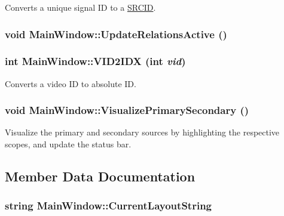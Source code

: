 Converts a unique signal ID to a \hyperlink{struct_s_r_c_i_d}{SRCID}. 

\hypertarget{class_main_window_c22d079e4851b5c33f45b08b4f788892}{
\subsubsection[{UpdateRelationsActive}]{\setlength{\rightskip}{0pt plus 5cm}void MainWindow::UpdateRelationsActive ()}}
\label{class_main_window_c22d079e4851b5c33f45b08b4f788892}


\hypertarget{class_main_window_556708726e6100f4a1a1ceb435988246}{
\subsubsection[{VID2IDX}]{\setlength{\rightskip}{0pt plus 5cm}int MainWindow::VID2IDX (int {\em vid})}}
\label{class_main_window_556708726e6100f4a1a1ceb435988246}


Converts a video ID to absolute ID. 

\hypertarget{class_main_window_fe5095ab6bf2691a33c51ee67121a867}{
\subsubsection[{VisualizePrimarySecondary}]{\setlength{\rightskip}{0pt plus 5cm}void MainWindow::VisualizePrimarySecondary ()}}
\label{class_main_window_fe5095ab6bf2691a33c51ee67121a867}


Visualize the primary and secondary sources by highlighting the respective scopes, and update the status bar. 



\subsection{Member Data Documentation}
\hypertarget{class_main_window_824d79e48c7054d60d83bae54eedb52a}{
\subsubsection[{CurrentLayoutString}]{\setlength{\rightskip}{0pt plus 5cm}string {\bf MainWindow::CurrentLayoutString}}}
\label{class_main_window_824d79e48c7054d60d83bae54eedb52a}


